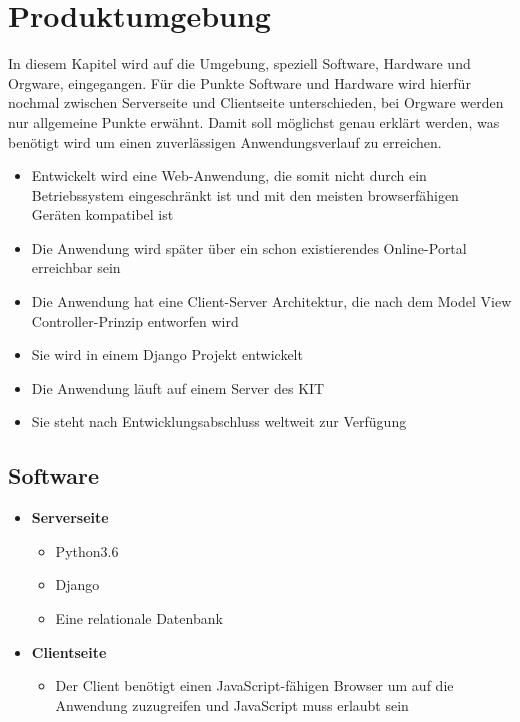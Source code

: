 
\chapter{Produktumgebung}

In diesem Kapitel wird auf die Umgebung, speziell Software, Hardware und Orgware, eingegangen. Für die Punkte Software und Hardware wird hierfür nochmal zwischen Serverseite und Clientseite unterschieden, bei \Gls{Orgware} werden nur allgemeine Punkte erwähnt. Damit soll möglichst genau erklärt werden, was benötigt wird um einen zuverlässigen Anwendungsverlauf zu erreichen.

\begin{itemize}
    \item Entwickelt wird eine Web-Anwendung, die somit nicht durch ein Betriebssystem eingeschränkt ist und mit den meisten browserfähigen Geräten kompatibel ist
    \item Die Anwendung wird später über ein schon existierendes Online-Portal erreichbar sein
    \item Die Anwendung hat eine Client-Server Architektur, die nach dem \Gls{Model View Controller}-Prinzip entworfen wird
    \item Sie wird in einem \Gls{Django} Projekt entwickelt
    \item Die Anwendung läuft auf einem \Gls{Server} des KIT
    \item Sie steht nach Entwicklungsabschluss weltweit zur Verfügung
\end{itemize}

\section{Software}

\begin{itemize}
    \item \textbf{Serverseite}
        \begin{itemize}
            \item Python3.6
            \item Django
            \item Eine relationale Datenbank
        \end{itemize}
    \item \textbf{Clientseite}
        \begin{itemize}
            \item Der \Gls{Client} benötigt einen \Gls{JavaScript}-fähigen Browser um auf die Anwendung zuzugreifen und JavaScript muss erlaubt sein
        \end{itemize}
\end{itemize}

